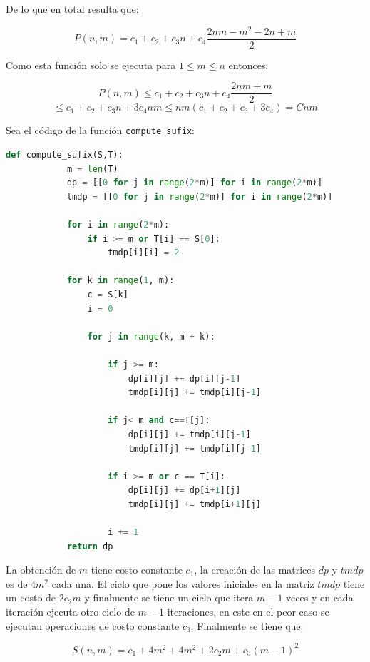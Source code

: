 \documentclass[a4paper]{article}
\begin{document}
    De lo que en total resulta que:

    $$P(n,m) = c_1 + c_2 + c_3n + c_4 \frac{2nm - m^2 - 2n + m}{2}$$

    Como esta funci\'on solo se ejecuta para $ 1 \leq m\leq n $ entonces:

    $$P(n,m) \leq c_1 + c_2 + c_3n + c_4 \frac{2nm + m}{2}$$
     $$ \leq c_1 + c_2 + c_3n + 3c_4nm \leq nm(c_1 + c_2 + c_3+ 3c_4) = Cnm$$

    Sea el c\'odigo de la funci\'on \texttt{compute\_sufix}: 

    \begin{lstlisting}[language=Python]
        def compute_sufix(S,T):
            m = len(T)
            dp = [[0 for j in range(2*m)] for i in range(2*m)]
            tmdp = [[0 for j in range(2*m)] for i in range(2*m)]
                    
            for i in range(2*m):
                if i >= m or T[i] == S[0]:
                    tmdp[i][i] = 2
                
            for k in range(1, m):    
                c = S[k]
                i = 0        
            
                for j in range(k, m + k):

                    if j >= m:
                        dp[i][j] += dp[i][j-1]
                        tmdp[i][j] += tmdp[i][j-1]          
                
                    if j< m and c==T[j]:
                        dp[i][j] += tmdp[i][j-1]
                        tmdp[i][j] += tmdp[i][j-1]
                
                    if i >= m or c == T[i]:
                        dp[i][j] += dp[i+1][j]
                        tmdp[i][j] += tmdp[i+1][j]

                    i += 1  
            return dp  
    \end{lstlisting}

    La obtenci\'on de $m$ tiene costo constante $c_1$, la creaci\'on de las matrices $dp$ y $tmdp$ es de $4m^2$ cada una.
    El ciclo que pone los valores iniciales en la matriz $tmdp$ tiene un costo de $2c_2m$ y finalmente se tiene  
    un ciclo que itera $m-1$ veces y en cada iteraci\'on ejecuta otro ciclo de $m-1$ iteraciones, en este en el peor caso se ejecutan 
    operaciones de costo constante $c_3$. Finalmente se tiene que: 

    $$S(n,m) = c_1 + 4m^2 + 4m^2 + 2c_2m + c_3(m-1)^2$$
\end{document}
